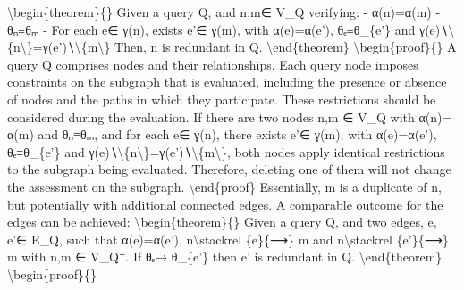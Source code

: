\documentclass{article}%
\begin{document}
\newline%
\textbackslash{}begin\{theorem\}\{\}\newline%
Given a query Q, and n,m∈ V\_Q verifying:\newline%
\newline%
{-} α(n)=α(m)\newline%
{-} θₙ≡θₘ\newline%
{-} For each e∈ γ(n), exists e'∈ γ(m), with α(e)=α(e'), θₑ≡θ\_\{e'\} and γ(e)∖\textbackslash{}\{n\textbackslash{}\}=γ(e')∖\textbackslash{}\{m\textbackslash{}\}\newline%
Then, n is redundant in Q.\newline%
\textbackslash{}end\{theorem\}\newline%
\newline%
\textbackslash{}begin\{proof\}\{\}\newline%
\newline%
A query Q comprises nodes and their relationships. Each query node imposes constraints on the subgraph that is evaluated, including the presence or absence of nodes and the paths in which they participate. These restrictions should be considered during the evaluation. If there are two nodes n,m ∈ V\_Q with α(n)= α(m) and θₙ≡θₘ, and for each e∈ γ(n), there exists e'∈ γ(m), with α(e)=α(e'), θₑ≡θ\_\{e'\} and γ(e)∖\textbackslash{}\{n\textbackslash{}\}=γ(e')∖\textbackslash{}\{m\textbackslash{}\}, both nodes apply identical restrictions to the subgraph being evaluated. Therefore, deleting one of them will not change the assessment on the subgraph.\newline%
\textbackslash{}end\{proof\}\newline%
\newline%
Essentially, m is a duplicate of n, but potentially with additional connected edges. A comparable outcome for the edges can be achieved:\newline%
\newline%
\textbackslash{}begin\{theorem\}\{\}\newline%
Given a query Q, and two edges, e, e'∈ E\_Q, such that α(e)=α(e'), n\textbackslash{}stackrel \{e\}\{⟶\} m and n\textbackslash{}stackrel \{e'\}\{⟶\} m with n,m ∈ V\_Q⁺. If θₑ→ θ\_\{e'\} then e' is redundant in Q.\newline%
\textbackslash{}end\{theorem\}\newline%
\newline%
\textbackslash{}begin\{proof\}\{\}\newline%
\newline%
\end{document}
